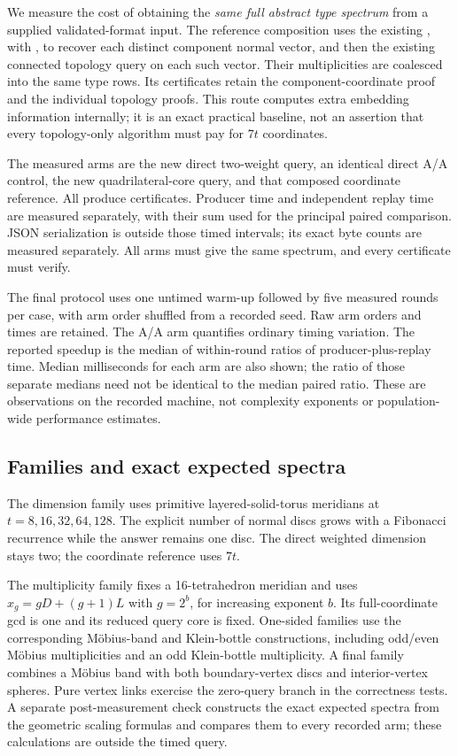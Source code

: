 We measure the cost of obtaining the \emph{same full abstract type spectrum}
from a supplied validated-format input. The reference composition uses the
existing , with , to recover
each distinct component normal vector, and then the existing connected
topology query on each such vector. Their multiplicities are coalesced into
the same type rows. Its certificates retain the component-coordinate proof
and the individual topology proofs. This route computes extra embedding
information internally; it is an exact practical baseline, not an assertion
that every topology-only algorithm must pay for $7t$ coordinates.

The measured arms are the new direct two-weight query, an identical direct
A/A control, the new quadrilateral-core query, and that composed coordinate
reference. All produce certificates. Producer time and independent replay
time are measured separately, with their sum used for the principal paired
comparison. JSON serialization is outside those timed intervals; its exact
byte counts are measured separately. All arms must give the same spectrum,
and every certificate must verify.

The final protocol uses one untimed warm-up followed by five measured
rounds per case, with arm order shuffled from a recorded seed. Raw arm
orders and times are retained. The A/A arm quantifies ordinary timing
variation. The reported speedup is the median of within-round ratios of
producer-plus-replay time. Median milliseconds for each arm are also
shown; the ratio of those separate medians need not be identical to the
median paired ratio. These are observations on the recorded machine,
not complexity exponents or population-wide performance estimates.

\subsection{Families and exact expected spectra}

The dimension family uses primitive layered-solid-torus meridians at
$t=8,16,32,64,128$. The explicit number of normal discs grows with a
Fibonacci recurrence while the answer remains one disc. The direct
weighted dimension stays two; the coordinate reference uses $7t$.

The multiplicity family fixes a 16-tetrahedron meridian and uses
$x_g=gD+(g+1)L$ with $g=2^b$, for increasing exponent $b$.
Its full-coordinate gcd is one and its reduced query core is fixed.
One-sided families use the corresponding M\"obius-band and Klein-bottle
constructions, including odd/even M\"obius multiplicities and an odd
Klein-bottle multiplicity. A final family combines a M\"obius band with
both boundary-vertex discs and interior-vertex spheres. Pure vertex links
exercise the zero-query branch in the correctness tests. A separate
post-measurement check constructs the exact expected spectra from the
geometric scaling formulas and compares them to every recorded arm; these
calculations are outside the timed query.

